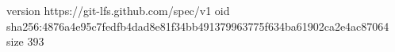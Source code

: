 version https://git-lfs.github.com/spec/v1
oid sha256:4876a4e95c7fedfb4dad8e81f34bb491379963775f634ba61902ca2e4ac87064
size 393

